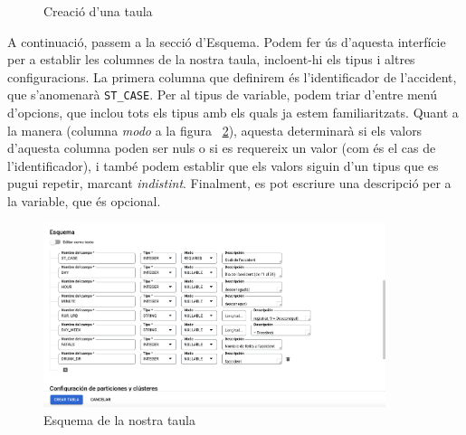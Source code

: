 \documentclass[12pt,longbibliography]{article}
\theoremstyle{definition}
\theoremstyle{remark}
\begin{document}
\begin{figure}[h!]
\par
{}%
\hfill
{}%
\par
\caption{Creació d'una taula}
\label{fig:bq6}
\end{figure}


A continuació, passem a la secció d'Esquema. Podem fer ús d'aquesta interfície per a establir les columnes de la nostra taula, incloent-hi els tipus i altres configuracions. La primera columna que definirem és l'identificador de l'accident, que s'anomenarà \verb|ST_CASE|. Per al tipus de variable, podem triar d'entre menú d'opcions, que inclou tots els tipus amb els quals ja estem familiaritzats. Quant a la manera (columna \textit{modo} a la figura ~\ref{fig:bq8}), aquesta determinarà si els valors d'aquesta columna poden ser nuls o si es requereix un valor (com és el cas de l'identificador), i també podem establir que els valors siguin d'un tipus que es pugui repetir, marcant \textit{indistint}. Finalment, es pot escriure una descripció per a la variable, que és opcional. 


\begin{figure}[h!]
\begin{center}
\includegraphics[width=10cm]{bq8}
\end{center}
\caption{Esquema de la nostra taula}
\label{fig:bq8}
\end{figure}
\end{document}
